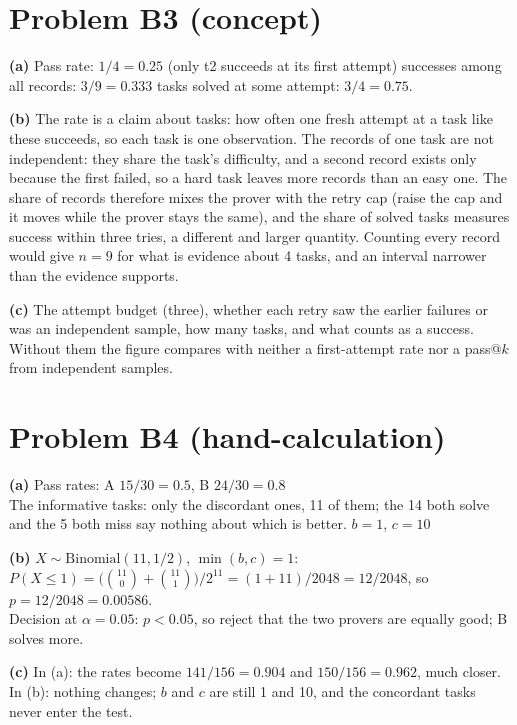 \documentclass[11pt]{article}
\begin{document}
\section*{Problem B3 (concept)}\label{ans:B3}
\begin{answer}
\textbf{(a)} Pass rate: $1/4 = 0.25$ (only t2 succeeds at its first attempt)
\quad successes among all records: $3/9 = 0.333$ \quad tasks solved at some
attempt: $3/4 = 0.75$.

\textbf{(b)} The rate is a claim about tasks: how often one fresh attempt at a
task like these succeeds, so each task is one observation. The records of one
task are not independent: they share the task's difficulty, and a second
record exists only because the first failed, so a hard task leaves more records
than an easy one. The share of records therefore mixes the prover with the
retry cap (raise the cap and it moves while the prover stays the same), and the
share of solved tasks measures success within three tries, a different and
larger quantity. Counting every record would give $n = 9$ for what is evidence
about 4 tasks, and an interval narrower than the evidence supports.

\textbf{(c)} The attempt budget (three), whether each retry saw the earlier
failures or was an independent sample, how many tasks, and what counts as a
success. Without them the figure compares with neither a first-attempt rate nor
a pass@$k$ from independent samples.
\end{answer}

\section*{Problem B4 (hand-calculation)}\label{ans:B4}
\begin{answer}
\textbf{(a)} Pass rates: A $15/30 = 0.5$, B $24/30 = 0.8$ \\
The informative tasks: only the discordant ones, 11 of them; the 14 both solve
and the 5 both miss say nothing about which is better. \quad $b = 1$, $c = 10$

\textbf{(b)} $X \sim \mathrm{Binomial}(11, 1/2)$, $\min(b, c) = 1$: \\
$P(X \leq 1) = \bigl(\binom{11}{0} + \binom{11}{1}\bigr)/2^{11} = (1 + 11)/2048 = 12/2048$,
so $p = 12/2048 = 0.00586$. \\
Decision at $\alpha = 0.05$: $p < 0.05$, so reject that the two provers are
equally good; B solves more.

\textbf{(c)} In (a): the rates become $141/156 = 0.904$ and $150/156 = 0.962$,
much closer. \quad In (b): nothing changes; $b$ and $c$ are still 1 and 10,
and the concordant tasks never enter the test.
\end{answer}
\end{document}
